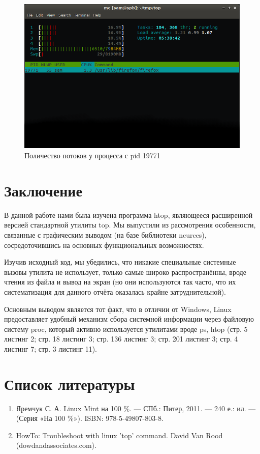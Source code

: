 \documentclass[a4paper, 12pt]{article}		%
\begin{document}
\begin{figure}[h!]
\centering
\includegraphics[scale=0.7]{res/NLWP.png}
\caption{Поличество потоков у процесса с pid 19771}
\end{figure}

\newpage
\section*{Заключение}

В данной работе нами была изучена программа htop, являющееся расширенной версией стандартной утилиты top. Мы выпустили из рассмотрения особенности, связанные с графическим выводом (на базе библиотеки ncurces), сосредоточившись на основных функциональных возможностях.

Изучив исходный код, мы убедились, что никакие специальные системные вызовы утилита не использует, только самые широко распространённы, вроде чтения из файла и вывод на экран (но они используются так часто, что их систематизация для данного отчёта оказалась крайне затруднительной).

Основным выводом является тот факт, что в отличии от Windows, Linux предоставляет удобный механизм сбора системной информации через файловую систему proc, который активно используется утилитами вроде ps, htop (стр. 5 листинг 2; стр. 18 листинг 3; стр. 136 листинг 3; стр. 201 листинг 3; стр. 4 листинг 7; стр. 3 листинг 11).

\newpage
\section*{Список литературы}

\begin{enumerate}
\item Яремчук С. А.  Linux Mint на 100 \%. — СПб.: Питер, 2011. — 240 е.: ил. — (Серия «На 100 \%»). ISBN: 978-5-49807-803-8.
\item HowTo: Troubleshoot with linux 'top' command. David Van Rood (dowdandassociates.com). 
\end{enumerate}
\end{document}
